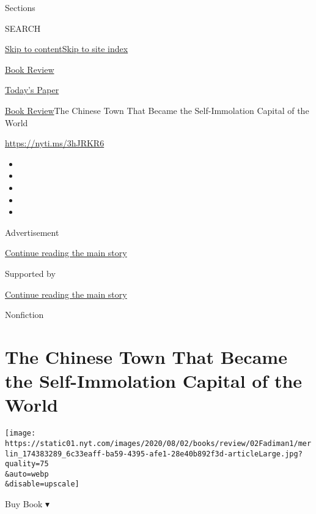 Sections

SEARCH

\protect\hyperlink{site-content}{Skip to
content}\protect\hyperlink{site-index}{Skip to site index}

\href{https://www.nytimes.com/section/books/review}{Book Review}

\href{https://myaccount.nytimes.com/auth/login?response_type=cookie\&client_id=vi}{}

\href{https://www.nytimes.com/section/todayspaper}{Today's Paper}

\href{/section/books/review}{Book Review}\textbar{}The Chinese Town That
Became the Self-Immolation Capital of the World

\url{https://nyti.ms/3hJRKR6}

\begin{itemize}
\item
\item
\item
\item
\item
\end{itemize}

Advertisement

\protect\hyperlink{after-top}{Continue reading the main story}

Supported by

\protect\hyperlink{after-sponsor}{Continue reading the main story}

Nonfiction

\hypertarget{the-chinese-town-that-became-the-self-immolation-capital-of-the-world}{%
\section{The Chinese Town That Became the Self-Immolation Capital of the
World}\label{the-chinese-town-that-became-the-self-immolation-capital-of-the-world}}

\texttt{[image: https://static01.nyt.com/images/2020/08/02/books/review/02Fadiman1/merlin\_174383289\_6c33eaff-ba59-4395-afe1-28e40b892f3d-articleLarge.jpg?quality=75\\\&auto=webp\\\&disable=upscale]}

Buy Book ▾

